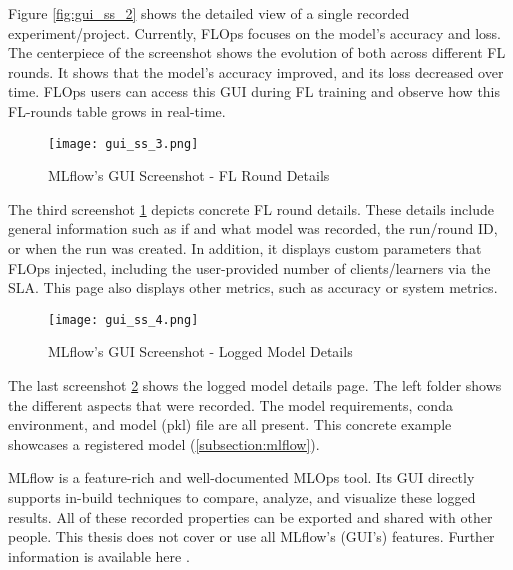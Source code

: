 Figure \ref{fig:gui_ss_2} shows the detailed view of a single recorded experiment/project.
Currently, FLOps focuses on the model's accuracy and loss.
The centerpiece of the screenshot shows the evolution of both across different FL rounds.
It shows that the model's accuracy improved, and its loss decreased over time.
FLOps users can access this GUI during FL training and observe how this FL-rounds table grows in real-time.

\begin{figure}[p]
    \centering
    \texttt{[image: gui\_ss\_3.png]}
    \caption{MLflow's GUI Screenshot - FL Round Details}
    \label{fig:gui_ss_3}
\end{figure}

The third screenshot \ref{fig:gui_ss_3} depicts concrete FL round details.
These details include general information such as if and what model was recorded, the run/round ID, or when the run was created.
In addition, it displays custom parameters that FLOps injected, including the user-provided number of clients/learners via the SLA.
This page also displays other metrics, such as accuracy or system metrics.

\begin{figure}[p]
    \begin{adjustwidth}{-0.1\paperwidth}{-0.1\paperwidth}
        \centering
        \texttt{[image: gui\_ss\_4.png]}
        \caption{MLflow's GUI Screenshot - Logged Model Details}
        \label{fig:gui_ss_4}
    \end{adjustwidth}
\end{figure}

The last screenshot \ref{fig:gui_ss_4} shows the logged model details page.
The left folder shows the different aspects that were recorded.
The model requirements, conda environment, and model (pkl) file are all present.
This concrete example showcases a registered model (\ref{subsection:mlflow}).

MLflow is a feature-rich and well-documented MLOps tool.
Its GUI directly supports in-build techniques to compare, analyze, and visualize these logged results.
All of these recorded properties can be exported and shared with other people.
This thesis does not cover or use all MLflow's (GUI's) features.
Further information is available here \cite{mlflow:homepage,mlflow:docs}.